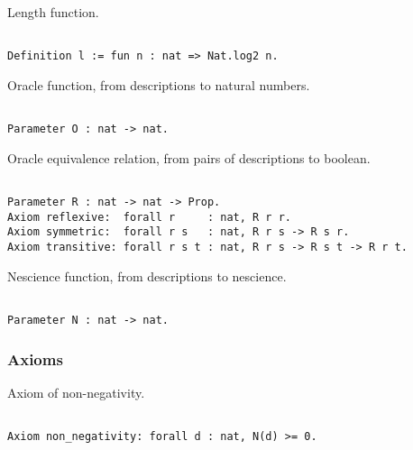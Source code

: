 Length function.

\begin{sourcecode}
{\scriptsize \begin{verbatim}

Definition l := fun n : nat => Nat.log2 n.

\end{verbatim}}
\end{sourcecode}

Oracle function, from descriptions to natural numbers.

\begin{sourcecode}
{\scriptsize \begin{verbatim}

Parameter O : nat -> nat.

\end{verbatim}}
\end{sourcecode}

Oracle equivalence relation, from pairs of descriptions to boolean.

\begin{sourcecode}
{\scriptsize \begin{verbatim}

Parameter R : nat -> nat -> Prop.
Axiom reflexive:  forall r     : nat, R r r.
Axiom symmetric:  forall r s   : nat, R r s -> R s r.
Axiom transitive: forall r s t : nat, R r s -> R s t -> R r t.

\end{verbatim}}
\end{sourcecode}

Nescience function, from descriptions to nescience.

\begin{sourcecode}
{\scriptsize \begin{verbatim}

Parameter N : nat -> nat.

\end{verbatim}}
\end{sourcecode}

\subsubsection*{Axioms}

Axiom of non-negativity.

\begin{sourcecode}
{\scriptsize \begin{verbatim}

Axiom non_negativity: forall d : nat, N(d) >= 0.

\end{verbatim}}
\end{sourcecode}

